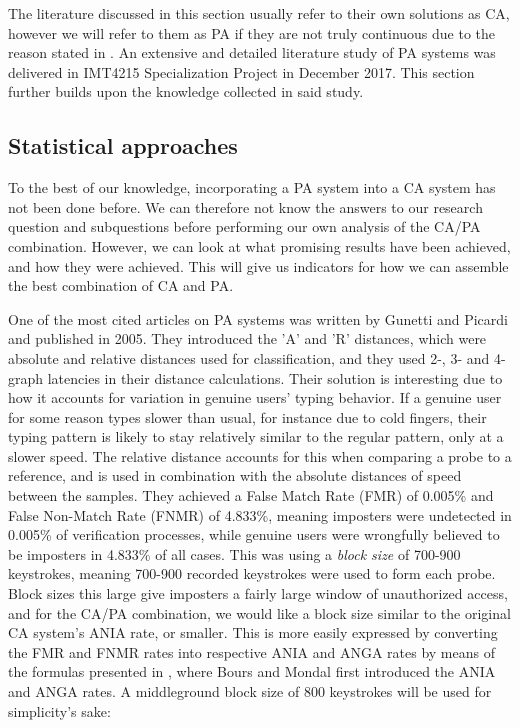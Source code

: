 The literature discussed in this section usually refer to their own solutions as CA, however we will refer to them as PA if they are not truly continuous due to the reason stated in .
An extensive and detailed literature study of PA systems \cite{nilsenSpec} was delivered in IMT4215 Specialization Project in December 2017.
This section further builds upon the knowledge collected in said study.

\subsection{Statistical approaches}
\label{sec:related-statistical-approaches}
To the best of our knowledge, incorporating a PA system into a CA system has not been done before. 
We can therefore not know the answers to our research question and subquestions before performing our own analysis of the CA/PA combination.
However, we can look at what promising results have been achieved, and how they were achieved.
This will give us indicators for how we can assemble the best combination of CA and PA.

One of the most cited articles on PA systems was written by Gunetti and Picardi \cite{gnp} and published in 2005.
They introduced the 'A' and 'R' distances, which were absolute and relative distances used for classification, and they used 2-, 3- and 4-graph latencies in their distance calculations.
Their solution is interesting due to how it accounts for variation in genuine users' typing behavior.
If a genuine user for some reason types slower than usual, for instance due to cold fingers, their typing pattern is likely to stay relatively similar to the regular pattern, only at a slower speed.
The relative distance accounts for this when comparing a probe to a reference, and is used in combination with the absolute distances of speed between the samples.
They achieved a False Match Rate (FMR) of 0.005\% and False Non-Match Rate (FNMR) of 4.833\%, meaning imposters were undetected in 0.005\% of verification processes, while genuine users were wrongfully believed to be imposters in 4.833\% of all cases. 
This was using a \textit{block size} of 700-900 keystrokes, meaning 700-900 recorded keystrokes were used to form each probe.
Block sizes this large give imposters a fairly large window of unauthorized access, and for the CA/PA combination, we would like a block size similar to the original CA system's ANIA rate, or smaller.
This is more easily expressed by converting the FMR and FNMR rates into respective ANIA and ANGA rates by means of the formulas presented in \cite{CA-performance}, where Bours and Mondal first introduced the ANIA and ANGA rates.
A middleground block size of 800 keystrokes will be used for simplicity's sake:

